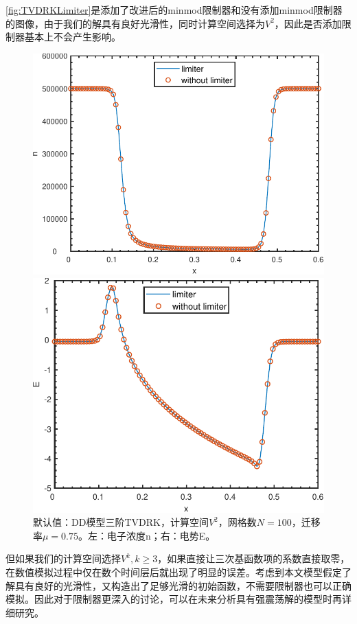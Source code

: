 \autoref{fig:TVDRKLimiter}是添加了改进后的minmod限制器和没有添加minmod限制器的图像，由于我们的解具有良好光滑性，同时计算空间选择为$V^2$，因此是否添加限制器基本上不会产生影响。
\begin{figure}
	\centering
	\begin{minipage}{0.45\linewidth}
		\centering
		\includegraphics[width=\linewidth]{figure/DDTVDRK3Degree2N100mu0.75limitern.pdf}
	\end{minipage}
	\hspace{1cm}
	\begin{minipage}{0.45\linewidth}
		\centering
		\includegraphics[width=\linewidth]{figure/DDTVDRK3Degree2N100mu0.75limiterE.pdf}
	\end{minipage}
	\caption{默认值：DD模型三阶TVDRK，计算空间$V^2$，网格数$N=100$，迁移率$\mu=0.75$。左：电子浓度n；右：电势E。}
	\label{fig:TVDRKLimiter}
\end{figure}
但如果我们的计算空间选择$V^k , k\geq 3$，如果直接让三次基函数项的系数直接取零，在数值模拟过程中仅在数个时间层后就出现了明显的误差。考虑到本文模型假定了解具有良好的光滑性，又构造出了足够光滑的初始函数，不需要限制器也可以正确模拟。因此对于限制器更深入的讨论，可以在未来分析具有强震荡解的模型时再详细研究。

